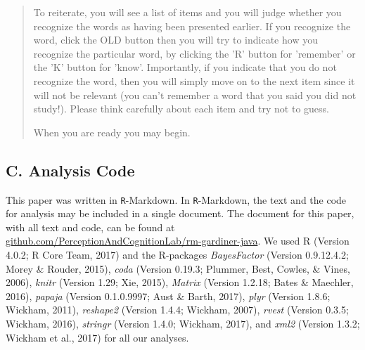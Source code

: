 \documentclass[english,,man,floatsintext]{apa6}
\begin{document}
\begin{quote}
To reiterate, you will see a list of items and you will judge whether you recognize the words as having been presented earlier. If you recognize the word, click the OLD button then you will try to indicate how you recognize the particular word, by clicking the 'R' button for 'remember' or the 'K' button for 'know'. Importantly, if you indicate that you do not recognize the word, then you will simply move on to the next item since it will not be relevant (you can't remember a word that you said you did not study!). Please think carefully about each item and try not to guess.

When you are ready you may begin.
\end{quote}

\newpage

\hypertarget{c.-analysis-code}{%
\subsection{C. Analysis Code}\label{c.-analysis-code}}

This paper was written in \texttt{R}-Markdown. In \texttt{R}-Markdown, the text and the code for analysis may be included in a single document. The document for this paper, with all text and code, can be found at \href{https://github.com/PerceptionAndCognitionLab/rm-gardiner-java/tree/public/papers/current}{github.com/PerceptionAndCognitionLab/rm-gardiner-java}. We used R (Version 4.0.2; R Core Team, 2017) and the R-packages \emph{BayesFactor} (Version 0.9.12.4.2; Morey \& Rouder, 2015), \emph{coda} (Version 0.19.3; Plummer, Best, Cowles, \& Vines, 2006), \emph{knitr} (Version 1.29; Xie, 2015), \emph{Matrix} (Version 1.2.18; Bates \& Maechler, 2016), \emph{papaja} (Version 0.1.0.9997; Aust \& Barth, 2017), \emph{plyr} (Version 1.8.6; Wickham, 2011), \emph{reshape2} (Version 1.4.4; Wickham, 2007), \emph{rvest} (Version 0.3.5; Wickham, 2016), \emph{stringr} (Version 1.4.0; Wickham, 2017), and \emph{xml2} (Version 1.3.2; Wickham et al., 2017) for all our analyses.
\end{document}
